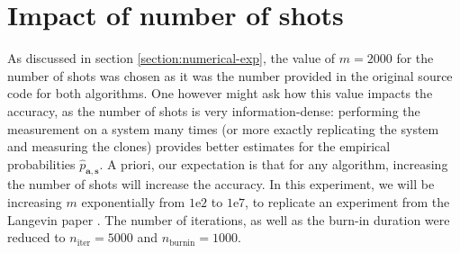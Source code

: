 \documentclass[12pt]{memoir}
\newcommand{\mb}{\mathbf}
\newcommand{\nitern}[1]{$n_{\text{iter}}=#1$}
\newcommand{\nburninn}[1]{$n_{\text{burnin}}=#1$}
\begin{document}
\section{Impact of number of shots}\label{section:comp-nb-shots}

As discussed in section \ref{section:numerical-exp}, the value of $m=2000$ for the number of shots was chosen as it was the number provided in the original source code for both algorithms. One however might ask how this value impacts the accuracy, as the number of shots is very information-dense: performing the measurement on a system many times (or more exactly replicating the system and measuring the clones) provides better estimates for the empirical probabilities $\hat p_{\mb a, \mb s}$. A priori, our expectation is that for any algorithm, increasing the number of shots will increase the accuracy. In this experiment, we will be increasing $m$ exponentially from $1\text{e}2$ to $1\text{e}7$, to replicate an experiment from the Langevin paper \cite{meth:bayesian:Langevin:ACMT2024}. The number of iterations, as well as the burn-in duration were reduced to \nitern{5000} and \nburninn{1000}.
\end{document}
